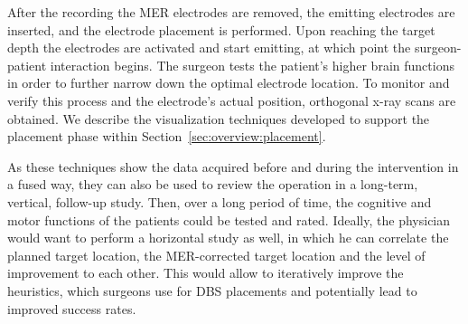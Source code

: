 \documentclass[review]{vgtc}                 %
\begin{document}
After the recording the MER electrodes are removed, the emitting electrodes are inserted, and the electrode placement is performed. Upon reaching the target depth the electrodes are activated and start emitting, at which point the surgeon-patient interaction begins. The surgeon tests the patient's higher brain functions in order to further narrow down the optimal electrode location. To monitor and verify this process and the electrode's actual position, orthogonal x-ray scans are obtained. We describe the visualization techniques developed to support the placement phase within Section~\ref{sec:overview:placement}.

As these techniques show the data acquired before and during the intervention in a fused way, they can also be used to review the operation in a long-term, vertical, follow-up study. Then, over a long period of time, the cognitive and motor functions of the patients could be tested and rated. Ideally, the physician would want to perform a horizontal study as well, in which he can correlate the planned target location, the MER-corrected target location and the level of improvement to each other. This would allow to iteratively improve the heuristics, which surgeons use for DBS placements and potentially lead to improved success rates.
\end{document}
